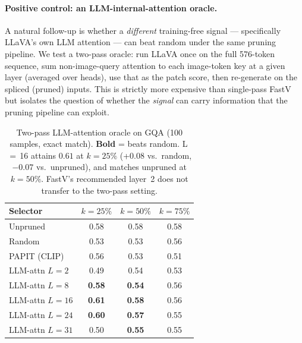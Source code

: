 \documentclass[10pt,twocolumn,letterpaper]{article}
\begin{document}
\paragraph{Positive control: an LLM-internal-attention oracle.}
A natural follow-up is whether a \emph{different} training-free
signal --- specifically LLaVA's own LLM attention --- can beat
random under the same pruning pipeline. We test a two-pass oracle:
run LLaVA once on the full 576-token sequence, sum non-image-query
attention to each image-token key at a given layer (averaged over
heads), use that as the patch score, then re-generate on the
spliced (pruned) inputs. This is strictly more expensive than
single-pass FastV~\cite{chen2024fastv} but isolates the question of
whether the \emph{signal} can carry information that the pruning
pipeline can exploit.

\begin{table}[htbp]
\centering
\small
\caption{Two-pass LLM-attention oracle on GQA (100 samples,
         exact match). \textbf{Bold} = beats random.
         L\,$=$\,16 attains $0.61$ at $k\!=\!25\%$ (+0.08 vs.\
         random, $-0.07$ vs.\ unpruned), and matches unpruned at
         $k\!=\!50\%$. FastV's recommended layer~2 does not transfer
         to the two-pass setting.}
\label{tab:oracle}
\begin{tabular}{@{}lccc@{}}
\toprule
Selector & $k\!=\!25\%$ & $k\!=\!50\%$ & $k\!=\!75\%$ \\
\midrule
Unpruned         & 0.58 & 0.58 & 0.58 \\
Random           & 0.53 & 0.53 & 0.56 \\
PAPIT (CLIP)     & 0.56 & 0.53 & 0.51 \\
\midrule
LLM-attn $L\!=\!2$  & 0.49 & 0.54 & 0.53 \\
LLM-attn $L\!=\!8$  & \textbf{0.58} & \textbf{0.54} & 0.56 \\
LLM-attn $L\!=\!16$ & \textbf{0.61} & \textbf{0.58} & 0.56 \\
LLM-attn $L\!=\!24$ & \textbf{0.60} & \textbf{0.57} & 0.55 \\
LLM-attn $L\!=\!31$ & 0.50 & \textbf{0.55} & 0.55 \\
\bottomrule
\end{tabular}
\end{table}
\end{document}

